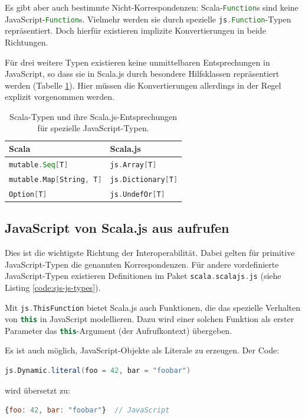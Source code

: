 \documentclass[a4paper, 12pt, hidelinks, listof=totoc, listoftables=totoc, bibliography=totoc]{scrreprt}
\newcommand{\scala}[1]{\lstinline[language=Scala, style=inline]|#1|}
\newcommand{\js}[1]{\lstinline[language=JavaScript, style=inline]|#1|}
\begin{document}
Es gibt aber auch bestimmte Nicht-Korrespondenzen: Scala-\scala{Function}s sind keine JavaScript-\js{Function}s. Vielmehr werden sie durch spezielle \scala{js.Function}-Typen repräsentiert. Doch hierfür existieren implizite Konvertierungen in beide Richtungen.

Für drei weitere Typen existieren keine unmittelbaren Entsprechungen in JavaScript, so dass sie in Scala.js durch besondere Hilfsklassen repräsentiert werden (Tabelle \ref{table:type-non-correspondance}). Hier müssen die Konvertierungen allerdings in der Regel explizit vorgenommen werden.

\begin{table}[!h]
\begin{tabular}{|l|l|}
\hline \textbf{Scala}                 & \textbf{Scala.js} \\ 
\hline \scala{mutable.Seq[T]}         & \scala{js.Array[T]} \\ 
\hline \scala{mutable.Map[String, T]} & \scala{js.Dictionary[T]} \\ 
\hline \scala{Option[T]}              & \scala{js.UndefOr[T]} \\ 
\hline 
\end{tabular}
\caption[Scala-Typen und ihre Scala.js-Entsprechungen für spezielle JavaScript-Typen.]{Scala-Typen und ihre Scala.js-Entsprechungen für spezielle JavaScript-Typen. \cite{scalajs.DJI}}
\label{table:type-non-correspondance}
\end{table}



\subsection{JavaScript von Scala.js aus aufrufen}

Dies ist die wichtigste Richtung der Interoperabilität. Dabei gelten für primitive JavaScript-Typen die genannten Korrespondenzen. Für andere vordefinierte JavaScript-Typen existieren Definitionen im Paket \scala{scala.scalajs.js} (siehe Listing \ref{code:sjs-js-types}).

Mit \scala{js.ThisFunction} bietet Scala.js auch Funktionen, die das spezielle Verhalten von \js{this} in JavaScript modellieren. Dazu wird einer solchen Funktion als erster Parameter das \js{this}-Argument (der Aufrufkontext) übergeben.

Es ist auch möglich, JavaScript-Objekte als Literale zu erzeugen. Der Code:
\begin{lstlisting}[language=Scala, style=snippet]
js.Dynamic.literal(foo = 42, bar = "foobar")
\end{lstlisting}
wird übersetzt zu:
\begin{lstlisting}[language=JavaScript, style=snippet]
{foo: 42, bar: "foobar"}  // JavaScript
\end{lstlisting}
\end{document}
